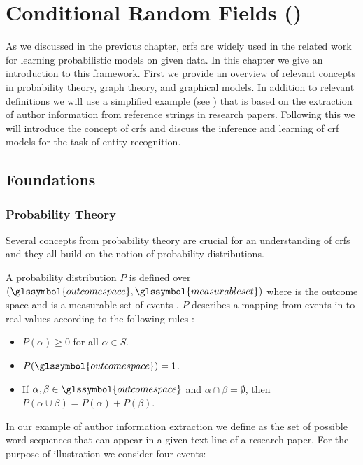 \chapter{Conditional Random Fields ()}\label{cha:crfs}

As we discussed in the previous chapter, \glspl{crf} are widely used in the related work for learning probabilistic models on given data.
In this chapter we give an introduction to this framework.
First we provide an overview of relevant concepts in probability theory, graph theory, and graphical models.
In addition to relevant definitions we will use a simplified example (see ) that is based on the extraction of author information from reference strings in research papers.
Following this we will introduce the concept of \glspl{crf} and discuss the inference and learning of \gls{crf} models for the task of entity recognition.

\section{Foundations}\label{sec:foundations}
\subsection{Probability Theory}\label{subsec:probability-theory}
Several concepts from probability theory are crucial for an understanding of \glspl{crf} and they all build on the notion of \glspl{probability distribution}.

A \gls{probability distribution} $P$ is defined over $(\glssymbol{outcome space},\glssymbol{measurable set})$ where  is the \gls{outcome space} and  is a \gls{measurable set} of \glspl{event} \citep{koller2009probabilistic}.
$P$ describes a mapping from events in  to real values according to the following rules \citep{koller2009probabilistic}:
\begin{itemize}
  \item $P(\alpha)\geq 0 $ for all $ \alpha \in S$.
  \item $P(\glssymbol{outcome space})=1$.
  \item If $\alpha,\beta\in \glssymbol{outcome space}$ and $\alpha\cap\beta = \emptyset$, then $P(\alpha\cup\beta)=P(\alpha)+P(\beta)$.
\end{itemize}

In our example of author information extraction we define  as the set of possible word sequences that can appear in a given text line of a research paper.
For the purpose of illustration we consider four events:

